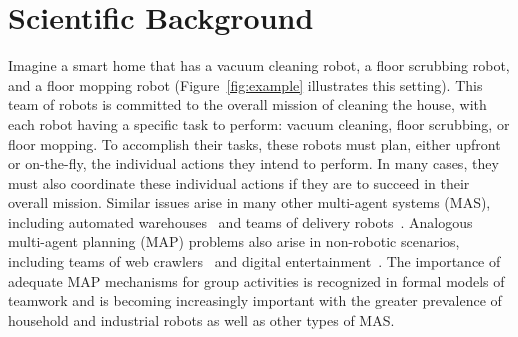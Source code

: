 \documentclass[11pt]{article}
\newcommand{\note}[1]{\textbf{\textit{#1}}}
\begin{document}




\section{Scientific Background}



Imagine a smart home that has a vacuum cleaning robot, a floor scrubbing robot, and a floor mopping robot (Figure~\ref{fig:example} illustrates this setting). This team of robots is committed to the overall mission of cleaning the house, with each robot having a specific task to perform: vacuum cleaning, floor scrubbing, or floor mopping. To accomplish their tasks, these robots must plan, either upfront or on-the-fly, the individual actions they intend to perform. In many cases, they must also coordinate these individual actions if they are to succeed in their overall mission. Similar issues arise in many other multi-agent systems (MAS), including automated warehouses~\cite{martinez2010autonomous,vivaldini2011intelligent} and teams of delivery robots~\cite{coltin2014scheduling}.  Analogous multi-agent planning (MAP) problems also arise in non-robotic scenarios, including teams of web crawlers~\cite{chiu2005towards,pant2002myspiders,sato2012agent} and digital entertainment~\cite{jaklin2013way}.  
The importance of adequate MAP mechanisms for group activities is recognized in formal models of teamwork and is becoming increasingly important with the greater prevalence of household and industrial robots as well as other types of MAS. %
\end{document}
